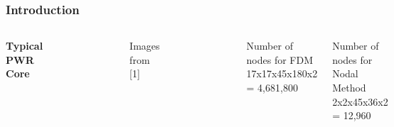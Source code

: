 \documentclass{beamer}
\begin{document}

\begin{frame}
\frametitle{Introduction}
\begin{columns}[c] %

\textbf{Typical PWR Core}
\begin{figure}
\includegraphics[width=0.8\linewidth]{core.png}
\end{figure}
\vspace{2cm}
Images from [1]

\begin{figure}
\includegraphics[width=0.8\linewidth]{FA.png}
\end{figure}
\begin{block}{Number of nodes for FDM}
\footnotesize{17x17x45x180x2 = 4,681,800}
\end{block}
\begin{block}{Number of nodes for Nodal Method}
\footnotesize{2x2x45x36x2 = 12,960}
\end{block}


\end{columns}
\end{frame}
\end{document}
